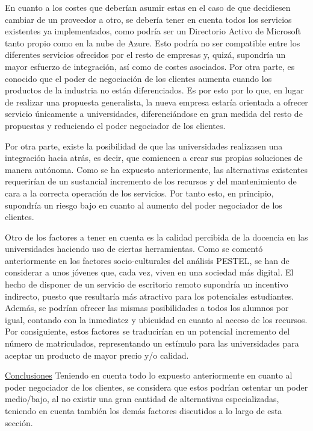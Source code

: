En cuanto a los costes que deberían asumir estas en el caso de que decidiesen cambiar de un proveedor a otro, se debería tener en cuenta todos los servicios existentes ya implementados, como podría ser un Directorio Activo de Microsoft tanto propio como en la nube de Azure. Esto podría no ser compatible entre los diferentes servicios ofrecidos por el resto de empresas y, quizá, supondría un mayor esfuerzo de integración, así como de costes asociados. Por otra parte, es conocido que el poder de negociación de los clientes aumenta cuando los productos de la industria no están diferenciados. Es por esto por lo que, en lugar de realizar una propuesta generalista, la nueva empresa estaría orientada a ofrecer servicio únicamente a universidades, diferenciándose en gran medida del resto de propuestas y reduciendo el poder negociador de los clientes.

Por otra parte, existe la posibilidad de que las universidades realizasen una integración hacia atrás, es decir, que comiencen a crear sus propias soluciones de manera autónoma. Como se ha expuesto anteriormente, las alternativas existentes requerirían de un sustancial incremento de los recursos y del mantenimiento de cara a la correcta operación de los servicios. Por tanto esto, en principio, supondría un riesgo bajo en cuanto al aumento del poder negociador de los clientes.

\clearpage

Otro de los factores a tener en cuenta es la calidad percibida de la docencia en las universidades haciendo uso de ciertas herramientas. Como se comentó anteriormente en los factores socio-culturales del análisis PESTEL, se han de considerar a unos jóvenes que, cada vez, viven en una sociedad más digital. El hecho de disponer de un servicio de escritorio remoto supondría un incentivo indirecto, puesto que resultaría más atractivo para los potenciales estudiantes. Además, se podrían ofrecer las mismas posibilidades a todos los alumnos por igual, contando con la inmediatez y ubicuidad en cuanto al acceso de los recursos. Por consiguiente, estos factores se traducirían en un potencial incremento del número de matriculados, representando un estímulo para las universidades para aceptar un producto de mayor precio y/o calidad.

\noindent\underline{Conclusiones}\newline
\indent Teniendo en cuenta todo lo expuesto anteriormente en cuanto al poder negociador de los clientes, se considera que estos podrían ostentar un poder medio/bajo, al no existir una gran cantidad de alternativas especializadas, teniendo en cuenta también los demás factores discutidos a lo largo de esta sección.

